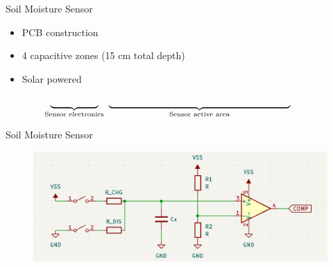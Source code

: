 \documentclass{beamer}
\begin{document}
\begin{frame}{Soil Moisture Sensor}
\begin{itemize}
    \item PCB construction
    \item 4 capacitive zones (15 cm total depth)
    \item Solar powered
\end{itemize}
\begin{figure}
    \centering
    
\end{figure}
$$\underbrace{\text{\hspace{5em}}}_{\text{Sensor electronics}}~\underbrace{\text{\hspace{19em}}}_{\text{Sensor active area}}\text{\hspace{2.5em}}$$
\end{frame}


\begin{frame}{Soil Moisture Sensor}
\begin{figure}
    \centering
    \includegraphics[width=\linewidth]{../thesis/fig/principle-cap-measure.png}
\end{figure}
\end{frame}
\end{document}
